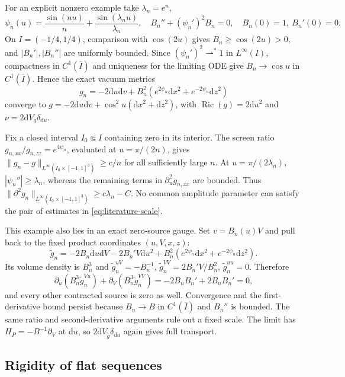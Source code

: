 \documentclass[11pt,a4paper]{article}
\numberwithin{equation}{section}
\newcommand{\Ric}{\operatorname{Ric}}
\newcommand{\dd}{\mathrm d}
\newcommand{\f}[2]{\frac{#1}{#2}}
\theoremstyle{definition}
\begin{document}
For an explicit nonzero example take $\lambda_n=e^n$,
\begin{equation*}
\psi_n(u)=\f{\sin(nu)}n+\f{\sin(\lambda_n u)}{\lambda_n},\quad
B_n''+(\psi_n')^2B_n=0,\quad B_n(0)=1,\ B_n'(0)=0.
\end{equation*}
On $I=(-1/4,1/4)$, comparison with $\cos(2u)$ gives $B_n\geq\cos(2u)>0$, and $|B_n'|,|B_n''|$ are uniformly bounded. Since $(\psi_n')^2\rightharpoonup^*1$ in $L^\infty(I)$,
compactness in $C^1(\overline I)$ and uniqueness for the limiting ODE
give $B_n\to\cos u$ in $C^1(\overline I)$. Hence the exact vacuum metrics
\begin{equation*}
g_n=-2\dd u\dd v+B_n^2(e^{2\psi_n}\dd x^2+e^{-2\psi_n}\dd z^2)
\end{equation*}
converge to $g=-2\dd u\dd v+\cos^2u(\dd x^2+\dd z^2)$, with $\Ric(g)=2\dd u^2$ and $\nu=2\dd V_g\delta_{\dd u}$.

Fix a closed interval $I_0\Subset I$ containing zero in its interior.
The screen ratio $g_{n,xx}/g_{n,zz}=e^{4\psi_n}$, evaluated at $u=\pi/(2n)$, gives $\|g_n-g\|_{L^\infty(I_0\times[-1,1]^3)}\geq c/n$ for all sufficiently large $n$. At $u=\pi/(2\lambda_n)$, $|\psi_n''|\geq \lambda_n$, whereas the remaining terms in $\partial_u^2g_{n,xx}$ are bounded. Thus $\|\partial^2g_n\|_{L^\infty(I_0\times[-1,1]^3)}\geq c\lambda_n-C$. No common amplitude parameter can satisfy the pair of estimates in \eqref{eq:literature-scale}.

This example also lies in an exact zero-source gauge. Set $v=B_n(u)V$ and pull back to the fixed product coordinates $(u,V,x,z)$:
\begin{equation*}
\widetilde g_n=-2B_n\dd u\dd V-2B_n'V\dd u^2
+B_n^2(e^{2\psi_n}\dd x^2+e^{-2\psi_n}\dd z^2).
\end{equation*}
Its volume density is $B_n^3$ and $\widetilde g_n^{uV}=-B_n^{-1}$, $\widetilde g_n^{VV}=2B_n'V/B_n^2$, $\widetilde g_n^{uu}=0$. Therefore
\begin{equation*}
\partial_u(B_n^3\widetilde g_n^{Vu})+\partial_V(B_n^3\widetilde g_n^{VV})
=-2B_nB_n'+2B_nB_n'=0,
\end{equation*}
and every other contracted source is zero as well. Convergence and the first-derivative bound persist because $B_n\to B$ in $C^1(\overline I)$ and $B_n''$ is bounded. The same ratio and second-derivative arguments rule out a fixed scale. The limit has $H_P=-B^{-1}\partial_V$ at $\dd u$, so $2\dd V_{\widetilde g}\delta_{\dd u}$ again gives full transport.

\subsection{Rigidity of flat sequences}
\end{document}
